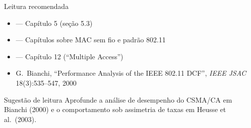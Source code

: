 \documentclass[aspectratio=169,11pt]{beamer}
\begin{document}
\begin{frame}{Leitura recomendada}
  \begin{itemize}
    \item \textbf{\kurose{}} --- Capítulo 5 (seção 5.3)
    \item \textbf{\stallings{}} --- Capítulos sobre MAC sem fio e padrão 802.11
    \item \textbf{\forouzan{}} --- Capítulo 12 (``Multiple Access'')
    \item G.\ Bianchi, ``Performance Analysis of the IEEE 802.11 DCF'', \emph{IEEE JSAC} 18(3):535--547, 2000
  \end{itemize}
  \begin{block}{Sugestão de leitura}
    Aprofunde a análise de desempenho do CSMA/CA em Bianchi (2000) e o comportamento sob assimetria de taxas em Heusse et al.\ (2003).
  \end{block}
\end{frame}
\end{document}
